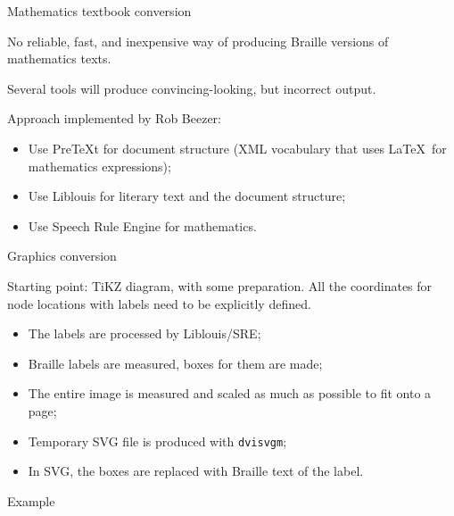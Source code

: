 


\frame{\titlepage}

\begin{frame}{Mathematics textbook conversion}

No reliable, fast, and inexpensive way of producing Braille versions of mathematics texts.

Several tools will produce convincing-looking, but incorrect output.
\pause

Approach implemented by Rob Beezer:
\begin{itemize}
\item
Use PreTeXt for document structure (XML vocabulary that uses \LaTeX\ for mathematics expressions);
\item
Use Liblouis for literary text and the document structure;
\item
Use Speech Rule Engine for mathematics.
\end{itemize}

\end{frame}


\begin{frame}{Graphics conversion}

Starting point: TiKZ diagram, with some preparation. All the coordinates for node locations with labels need to be explicitly defined.

\begin{itemize}
\item
The labels are processed by Liblouis/SRE;
\item
Braille labels are measured, boxes for them are made;
\item
The entire image is measured and scaled as much as possible to fit onto a page;
\item
Temporary SVG file is produced with {\tt dvisvgm};
\item
In SVG, the boxes are replaced with Braille text of the label.
\end{itemize}

\end{frame}


\begin{frame}{Example}

\centering



\end{frame}

